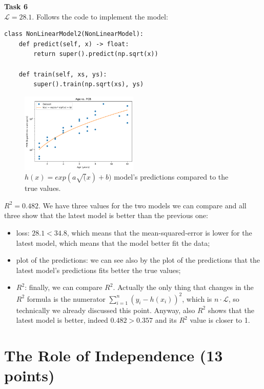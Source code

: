 \documentclass[a4paper,12pt]{article}
\begin{document}
\vspace{1em}
\noindent\textbf{Task 6}\\
$\mathcal{L} = 28.1$. Follows the code to implement the model:

\begin{lstlisting}
class NonLinearModel2(NonLinearModel):
    def predict(self, x) -> float:
        return super().predict(np.sqrt(x))
    
    def train(self, xs, ys):
        super().train(np.sqrt(xs), ys)
\end{lstlisting}

\begin{figure}[htbp]
	\centering
	\includegraphics[width=0.5\textwidth]{a2-t6}
	\caption{$h(x) = exp(a \sqrt(x) + b)$ model's predictions compared to the true values.}
\end{figure}

$R^2 = 0.482$. We have three values for the two models we can
compare and all three show that the latest model is better than the previous
one:
\begin{itemize}
	\item loss: $28.1< 34.8$, which means that the
	      mean-squared-error is lower for the latest model, which means that the
	      model better fit the data;

	\item plot of the predictions: we can see also by the plot of the
	      predictions that the latest model's predictions fits better the true
	      values;

	\item $R^2$: finally, we can compare $R^2$. Actually the only thing that
	      changes in the $R^2$ formula is the numerator $\sum_{i=1}^{n} (y_i -
		      h(x_i))^2$, which is $n \cdot \mathcal{L}$, so technically we
	      already discussed this point. Anyway, also $R^2$ shows that the
	      latest model is better, indeed $0.482 > 0.357$ and its $R^2$ value is
	      closer to 1.
\end{itemize}


\section{The Role of Independence (13 points)}
\end{document}
